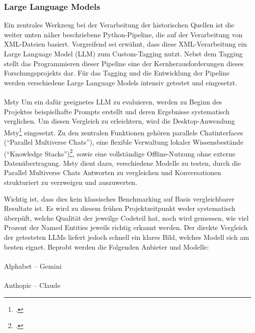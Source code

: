 \documentclass[12pt, a4paper, ngerman, bidi=default]{article}
\makeatletter
\let\cite\footcite
\let\oldparagraph\paragraph%
\renewcommand{\paragraph}{
    \@ifstar%
      \xxxParagraphStar%
      \xxxParagraphNoStar%
 }
\newcommand{\xxxParagraphStar}[1]{\oldparagraph*{#1}\mbox{}}
\newcommand{\xxxParagraphNoStar}[1]{\oldparagraph{#1}\mbox{}}
\makeatother
\begin{document}
\subsubsection{Large Language Models} \label{subsubsec:LLM_use}
Ein zentrales Werkzeug bei der Verarbeitung der historischen Quellen ist die weiter unten näher beschriebene Python-Pipeline, die auf der Verarbeitung von XML-Dateien basiert. Vorgreifend sei erwähnt, dass diese XML-Verarbeitung ein Large Language Model (LLM) zum Custom-Tagging nutzt. Nebst dem Tagging stellt das Programmieren dieser Pipeline eine der Kernherausforderungen dieses Forschungsprojekts dar. 
Für das Tagging und die Entwicklung der Pipeline werden verschiedene Large Language Models intensiv getestet und eingesetzt.
\paragraph{Msty}
Um ein dafür geeignetes LLM zu evaluieren, werden zu Beginn des Projektes beispielhafte Prompts erstellt und deren Ergebnisse systematisch verglichen. Um diesen Vergleich zu erleichtern, wird die Desktop-Anwendung Msty\cite[vgl][]{noauthor_msty_nodate} eingesetzt. Zu den zentralen Funktionen gehören parallele Chatinterfaces (\enquote{Parallel Multiverse Chats}),
eine flexible Verwaltung lokaler Wissensbestände (\enquote{Knowledge Stacks})\cite[vgl][]{noauthor_msty_nodate}, sowie eine vollständige Offline-Nutzung ohne externe Datenübertragung. Msty dient dazu, verschiedene Modelle zu testen, durch die Parallel Multiverse Chats Antworten zu vergleichen und Konversationen strukturiert zu verzweigen und auszuwerten.

Wichtig ist, dass dies kein klassisches Benchmarking auf Basis vergleichbarer Resultate ist. Es wird zu diesem frühen Projektzeitpunkt weder systematisch überpüft, welche Qualität der jeweilge Codeteil hat, noch wird gemessen, wie viel Prozent der Named Entities jeweils richtig erkannt werden. Der direkte Vergleich der getesteten LLMs liefert jedoch schnell ein klares Bild, welches Modell sich am besten eignet. Beprobt werden die Folgenden Anbieter und Modelle:



\paragraph{Alphabet – Gemini}
\paragraph{Anthopic – Claude}
\end{document}
